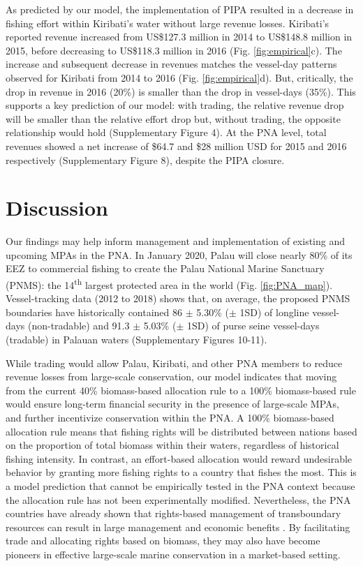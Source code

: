 \documentclass[12pt]{article}
\begin{document}
As predicted by our model, the implementation of PIPA resulted in a decrease in fishing effort within Kiribati's water without large revenue losses. Kiribati's reported revenue increased from US\$127.3 million in 2014 to US\$148.8 million in 2015, before decreasing to US\$118.3 million in 2016 (Fig. \ref{fig:empirical}c). The increase and subsequent decrease in revenues matches the vessel-day patterns observed for Kiribati from 2014 to 2016 (Fig. \ref{fig:empirical}d). But, critically, the drop in revenue in 2016 (20\%) is smaller than the drop in vessel-days (35\%). This supports a key prediction of our model: with trading, the relative revenue drop will be smaller than the relative effort drop but, without trading, the opposite relationship would hold (Supplementary Figure 4). At the PNA level, total revenues showed a net increase of \$64.7 and \$28 million USD for 2015 and 2016 respectively (Supplementary Figure 8), despite the PIPA closure.

\section{Discussion}

Our findings may help inform management and implementation of existing and upcoming MPAs in the PNA. In January 2020, Palau will close nearly 80\% of its EEZ to commercial fishing to create the Palau National Marine Sanctuary (PNMS): the 14\textsuperscript{th} largest protected area in the world (Fig. \ref{fig:PNA_map}). Vessel-tracking data (2012 to 2018) shows that, on average, the proposed PNMS boundaries have historically contained 86 $\pm$ 5.30\% ($\pm$ 1SD) of longline vessel-days (non-tradable) and 91.3 $\pm$ 5.03\% ($\pm$ 1SD) of purse seine vessel-days (tradable) in Palauan waters (Supplementary Figures 10-11).

While trading would allow Palau, Kiribati, and other PNA members to reduce revenue losses from large-scale conservation, our model indicates that moving from the current 40\% biomass-based allocation rule to a 100\% biomass-based rule would ensure long-term financial security in the presence of large-scale MPAs, and further incentivize conservation within the PNA. A 100\% biomass-based allocation rule means that fishing rights will be distributed between nations based on the proportion of total biomass within their waters, regardless of historical fishing intensity. In contrast, an effort-based allocation would reward undesirable behavior by granting more fishing rights to a country that fishes the most. This is a model prediction that cannot be empirically tested in the PNA context because the allocation rule has not been experimentally modified. Nevertheless, the PNA countries have already shown that rights-based management of transboundary resources can result in large management and economic benefits \cite{havice_2013,aqorau_2018}. By facilitating trade and allocating rights based on biomass, they may also have become pioneers in effective large-scale marine conservation in a market-based setting.
\end{document}
